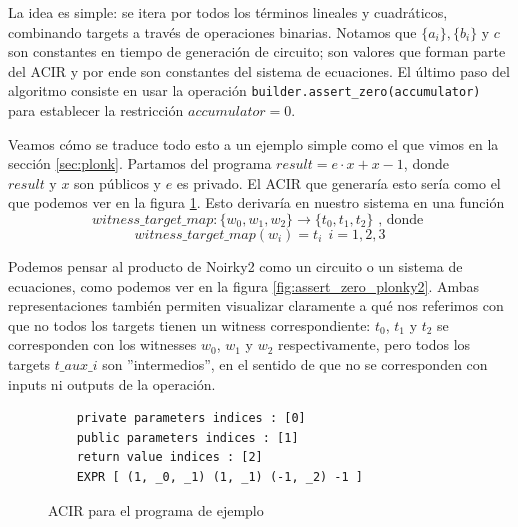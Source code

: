 La idea es simple: se itera por todos los términos lineales y cuadráticos, combinando targets a través de operaciones binarias. Notamos que $\{a_i\}, \{b_i\} \text{ y } c$ son constantes en tiempo de generación de circuito; son valores que forman parte del ACIR y por ende son constantes del sistema de ecuaciones. El último paso del algoritmo consiste en usar la operación \texttt{builder.assert\_zero(accumulator)} para establecer la restricción $accumulator = 0$.

Veamos cómo se traduce todo esto a un ejemplo simple como el que vimos en la sección \ref{sec:plonk}. Partamos del programa $result = e \cdot x + x - 1$, donde $result \text{ y } x$ son públicos y $e$ es privado. El ACIR que generaría esto sería como el que podemos ver en la figura \ref{fig:ACIR_ejemplo_traduccion_assert_zero}. Esto derivaría en nuestro sistema en una función 
$$witness\_target\_map: \{w_0,w_1,w_2\} \rightarrow \{t_0, t_1, t_2\} \text{ , donde }$$
$$ witness\_target\_map(w_i) = t_i ~~ i=1,2,3$$ 

Podemos pensar al producto de Noirky2 como un circuito o un sistema de ecuaciones, como podemos ver en la figura \ref{fig:assert_zero_plonky2}. Ambas representaciones también permiten visualizar claramente a qué nos referimos con que no todos los targets tienen un witness correspondiente: $t_0$, $t_1$ y $t_2$ se corresponden con los witnesses $w_0$, $w_1$ y $w_2$ respectivamente, pero todos los targets $t\_aux\_i$ son ''intermedios'', en el sentido de que no se corresponden con inputs ni outputs de la operación.  

\begin{figure} 
    \centering
    \begin{verbatim}
    private parameters indices : [0]
    public parameters indices : [1]
    return value indices : [2]
    EXPR [ (1, _0, _1) (1, _1) (-1, _2) -1 ]
    \end{verbatim}
    \caption{ACIR para el programa de ejemplo}
    \label{fig:ACIR_ejemplo_traduccion_assert_zero}
\end{figure}

